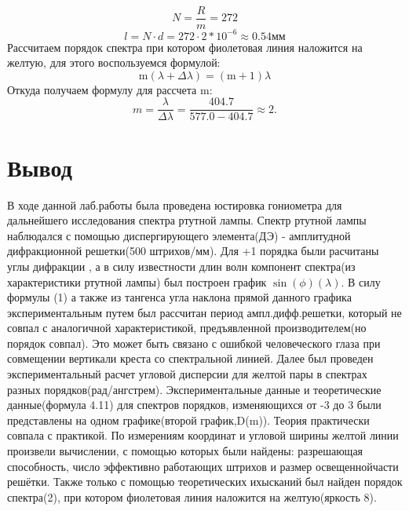 \documentclass[a4paper,12pt]{article} %
\begin{document}
\begin{equation}
N = \frac{R}{m} = 272
\end{equation}
\begin{equation}
l = N \cdot d = 272 \cdot 2*10^{-6} \approx 0.54 \text{мм}
\end{equation}
Рассчитаем порядок спектра при котором фиолетовая линия наложится на желтую, для этого воспользуемся формулой:
\begin{equation}
\text{m}(\lambda + \Delta\lambda) = (\text{m} + 1)\lambda
\end{equation}
Откуда получаем формулу для рассчета m:
\begin{equation}
m = \frac{\lambda}{\Delta\lambda} = \frac{404.7}{577.0 - 404.7} \approx 2.
\end{equation}

\section{Вывод}
В ходе данной лаб.работы была проведена юстировка гониометра для дальнейшего исследования спектра ртутной лампы. Спектр ртутной лампы наблюдался с помощью диспергирующего элемента(ДЭ) - амплитудной дифракционной решетки(500 штрихов/мм). Для +1 порядка были расчитаны углы дифракции , а в силу известности длин волн компонент спектра(из характеристики ртутной лампы) был построен график $\sin(\phi)(\lambda)$. В силу формулы (1) а также из тангенса угла наклона прямой данного графика экспериментальным путем был рассчитан период ампл.дифф.решетки, который не совпал с аналогичной характеристикой, предъявленной производителем(но порядок совпал). Это может быть связано с ошибкой человеческого глаза при совмещении вертикали креста со спектральной линией. 
Далее был проведен экспериментальный расчет угловой дисперсии для желтой пары в спектрах разных порядков(рад/ангстрем). Экспериментальные данные и теоретические данные(формула 4.11) для спектров порядков, изменяющихся от -3 до 3 были представлены на одном графике(второй график,D(m)). Теория практически совпала с практикой. По измерениям координат и угловой ширины желтой линии произвели вычислении, с помощью которых были найдены: разрешающая способность, число эффективно работающих штрихов и размер освещеннойчасти решётки.
Также только с помощью теоретических ихысканий был найден порядок спектра(2), при котором фиолетовая линия наложится на желтую(яркость 8).
\end{document}
